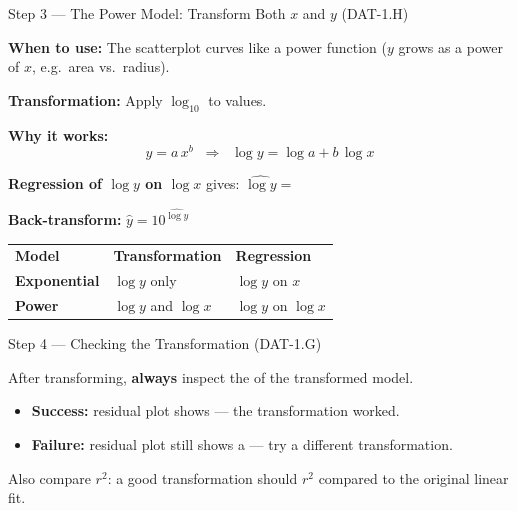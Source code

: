 \documentclass[10pt]{article}
\begin{document}
\vspace{0.1in}

\begin{notesbox}{Step 3 --- The Power Model: Transform Both $x$ and $y$ (DAT-1.H)}
\small

\noindent \textbf{When to use:} The scatterplot curves like a power function ($y$ grows as a
power of $x$, e.g.\ area vs.\ radius).

\vspace{6pt}
\textbf{Transformation:} Apply $\log_{10}$ to \blank{5cm} values.

\vspace{4pt}
\textbf{Why it works:}
\[
  y = a\,x^b
  \;\;\Longrightarrow\;\;
  \log y = \log a + b\,\log x
\]

\vspace{6pt}
\textbf{Regression of $\log y$ on $\log x$} gives: \quad $\widehat{\log y} = $ \blank{6cm}

\vspace{6pt}
\textbf{Back-transform:} \quad $\hat{y} = 10^{\widehat{\log y}}$

\vspace{6pt}
\renewcommand{\arraystretch}{1.6}
\begin{tabularx}{\linewidth}{@{} >{\bfseries}p{3cm} X X @{}}
\rowcolor{sky} \textbf{Model} & \textbf{Transformation} & \textbf{Regression} \\
Exponential & $\log y$ only & $\log y$ on $x$ \\
Power       & $\log y$ and $\log x$ & $\log y$ on $\log x$ \\
\end{tabularx}

\end{notesbox}

\vspace{0.1in}

\begin{notesbox}{Step 4 --- Checking the Transformation (DAT-1.G)}
\small

\noindent After transforming, \textbf{always} inspect the \blank{4cm} of the transformed
model.

\vspace{4pt}
\begin{itemize}[itemsep=3pt]
  \item \textbf{Success:} residual plot shows \blank{5cm} --- the transformation worked.
  \item \textbf{Failure:} residual plot still shows a \blank{4cm} --- try a different transformation.
\end{itemize}

\vspace{6pt}
Also compare \textbf{$r^2$}: a good transformation should \blank{5cm} $r^2$ compared to
the original linear fit.

\end{notesbox}
\end{document}
